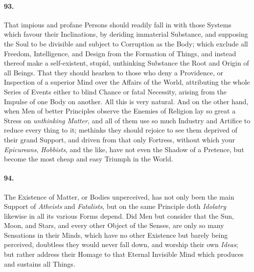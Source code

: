 \documentclass[]{article}
\newenvironment{sectionbody}{}{}
\begin{document}
\begin{sectionbody}
\paragraph{93.} That impious and profane Persons should readily fall in with
those Systems which favour their Inclinations, by deriding
immaterial Substance, and supposing the Soul to be divisible and
subject to Corruption as the Body; which exclude all Freedom,
Intelligence, and Design from the Formation of Things, and
instead thereof make a self-existent, stupid, unthinking
Substance the Root and Origin of all Beings.  That they should
hearken to those who deny a Providence, or Inspection of a
superior Mind over the Affairs of the World, attributing the
whole Series of Events either to blind Chance or fatal Necessity,
arising from the Impulse of one Body on another.  All this is
very natural.  And on the other hand, when Men of better
Principles observe the Enemies of Religion lay so great a Stress
on \emph{unthinking Matter}, and all of them use so much
Industry and Artifice to reduce every thing to it; methinks they
should rejoice to see them deprived of their grand Support, and
driven from that only Fortress, without which your
\emph{Epicureans}, \emph{Hobbists}, and the like, have not
even the Shadow of a Pretence, but become the most cheap and easy
Triumph in the World.



\paragraph{94.} The Existence of Matter, or Bodies unperceived, has not only been
the main Support of \emph{Atheists} and \emph{Fatalists}, but
on the same Principle doth \emph{Idolatry} likewise in all its
various Forms depend.  Did Men but consider that the Sun, Moon,
and Stars, and every other Object of the Senses, are only so many
Sensations in their Minds, which have no other Existence but
barely being perceived, doubtless they would never fall down, and
worship their own \emph{Ideas}; but rather address their Homage
to that {\sc Eternal Invisible Mind} which produces and sustains
all Things.




\end{sectionbody}
\end{document}

